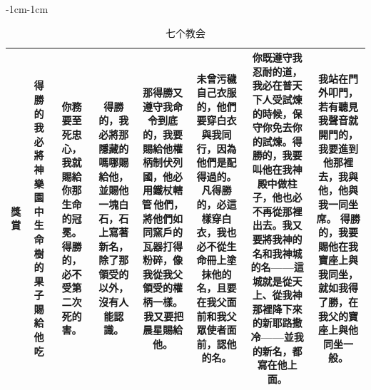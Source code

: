 \begin{changemargin}{-1cm}{-1cm}
\begin{table}
\begin{tabular}{cccccccc}
\multicolumn{1}{m{.3cm}|}{獎賞}&
\multicolumn{1}{m{3cm}|}{得勝的我必將神樂園中生命樹的果子賜給他吃}  &
 \multicolumn{1}{m{2cm}|}{你務要至死忠心，我就賜給你那生命的冠冕。得勝的，必不受第二次死的害。} &
 \multicolumn{1}{m{3cm}|}{得勝的，我必將那隱藏的嗎哪賜給他，並賜他一塊白石，石上寫著新名，除了那領受的以外，沒有人能認識。 } & 
  \multicolumn{1}{m{4cm}|}{那得勝又遵守我命令到底的，我要賜給他權柄制伏列國，他必用鐵杖轄管 他們，將他們如同窯戶的瓦器打得粉碎，像我從我父領受的權柄一樣。  我又要把晨星賜給他。 }& 
   \multicolumn{1}{m{3cm}|}{未曾污穢自己衣服的，他們要穿白衣與我同行，因為他們是配得過的。 凡得勝的，必這樣穿白衣，我也必不從生命冊上塗抹他的名，且要在我父面前和我父眾使者面前，認他的名。 } & 
    \multicolumn{1}{m{3.6cm}|}{你既遵守我忍耐的道，我必在普天下人受試煉的時候，保守你免去你的試煉。得勝的，我要叫他在我神殿中做柱子，他也必不再從那裡出去。我又要將我神的名和我神城的名——這城就是從天上、從我神那裡降下來的新耶路撒冷——並我的新名，都寫在他上面。 } &
     \multicolumn{1}{m{3cm}|}{我站在門外叩門，若有聽見我聲音就開門的，我要進到他那裡去，我與他，他與我一同坐席。 得勝的，我要賜他在我寶座上與我同坐，就如我得了勝，在我父的寶座上與他同坐一般。} \\\hline
\end{tabular}
\caption{七个教会}
\end{table} 
\end{changemargin}





